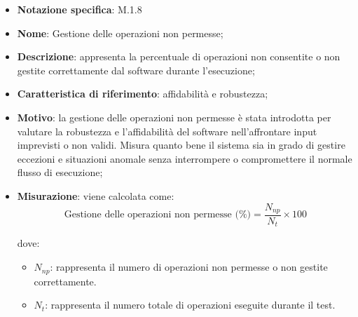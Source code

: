 \begin{itemize}
    \item \textbf{Notazione specifica}: M.1.8
    \item \textbf{Nome}:  Gestione delle operazioni non permesse;
    \item \textbf{Descrizione}: appresenta la percentuale di operazioni non consentite o non gestite correttamente dal software durante l'esecuzione;
    \item \textbf{Caratteristica di riferimento}: affidabilità e robustezza;
    \item \textbf{Motivo}: la gestione delle operazioni non permesse è stata introdotta per valutare la robustezza e l'affidabilità del software nell'affrontare input imprevisti o non validi. Misura quanto bene il sistema sia in grado di gestire eccezioni e situazioni anomale senza interrompere o compromettere il normale flusso di esecuzione;
    \item \textbf{Misurazione}: viene calcolata come:
    \[
    \text{Gestione delle operazioni non permesse (\%)} = \frac{N_{np}}{N_{t}} \times 100
    \]
    
    dove:
    \begin{itemize}
        \item $N_{np}$: rappresenta il numero di operazioni non permesse o non gestite correttamente.
        \item $N_{t}$: rappresenta il numero totale di operazioni eseguite durante il test.
    \end{itemize}
\end{itemize}